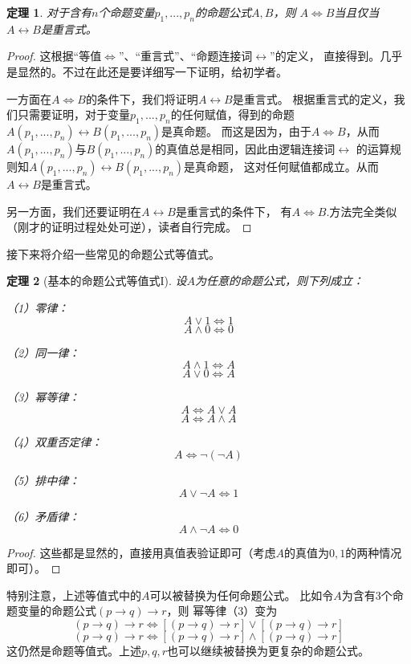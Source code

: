 \documentclass[a4paper, 11pt]{article} %
\newtheorem{thm}{定理}[subsection]
\begin{document}
\begin{thm}对于含有$n$个命题变量$p_1,...,p_n$的命题公式$A,B$，则
$A\Leftrightarrow B$当且仅当$A\leftrightarrow B$是重言式。
\end{thm}
\begin{proof}
这根据“等值$\Leftrightarrow$”、“重言式”、“命题连接词$\leftrightarrow$”的定义，
直接得到。几乎是显然的。不过在此还是要详细写一下证明，给初学者。

一方面在$A\Leftrightarrow B$的条件下，我们将证明$A\leftrightarrow B$是重言式。
根据重言式的定义，我们只需要证明，对于变量$p_1,...,p_n$的任何赋值，得到的命题
$A(p_1,...,p_n)\leftrightarrow B(p_1,...,p_n)$是真命题。
而这是因为，由于$A\Leftrightarrow B$，从而
$A(p_1,...,p_n)$与$B(p_1,...,p_n)$的真值总是相同，因此由逻辑连接词$\leftrightarrow$
的运算规则知$A(p_1,...,p_n)\leftrightarrow B(p_1,...,p_n)$是真命题，
这对任何赋值都成立。从而$A\leftrightarrow B$是重言式。

另一方面，我们还要证明在$A\leftrightarrow B$是重言式的条件下，
有$A\Leftrightarrow B$.方法完全类似（刚才的证明过程处处可逆），读者自行完成。
\end{proof}

接下来将介绍一些常见的命题公式等值式。

\begin{thm}[基本的命题公式等值式I]\label{prop-dingzhi-gongshi-1}
设$A$为任意的命题公式，则下列成立：

（1）零律：$$A\vee1\Leftrightarrow1$$
$$A\wedge0\Leftrightarrow0$$

（2）同一律：$$A\wedge1\Leftrightarrow A$$
$$A\vee0\Leftrightarrow A$$

（3）幂等律：$$A\Leftrightarrow A\vee A$$
$$A\Leftrightarrow A\wedge A$$

（4）双重否定律：$$A\Leftrightarrow \neg(\neg A)$$

（5）排中律：$$A\vee\neg A\Leftrightarrow1$$

（6）矛盾律：$$A\wedge\neg A\Leftrightarrow0$$

\end{thm}
\begin{proof}
这些都是显然的，直接用真值表验证即可（考虑$A$的真值为$0,1$的两种情况即可）。
\end{proof}

特别注意，上述等值式中的$A$可以被替换为任何命题公式。
比如令$A$为含有3个命题变量的命题公式$(p\rightarrow q)\rightarrow r$，则
幂等律（3）变为
$$(p\rightarrow q)\rightarrow r
\Leftrightarrow [(p\rightarrow q)\rightarrow r]\vee [(p\rightarrow q)\rightarrow r]$$
$$(p\rightarrow q)\rightarrow r
\Leftrightarrow [(p\rightarrow q)\rightarrow r]\wedge [(p\rightarrow q)\rightarrow r]$$
这仍然是命题等值式。上述$p,q,r$也可以继续被替换为更复杂的命题公式。
\end{document}
